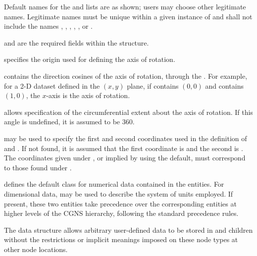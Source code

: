 \begin{notes}
\item Default names for the  and
       lists are as shown; users may choose
      other legitimate names.
      Legitimate names must be unique within a given instance
      of  and shall not include the names
      , ,
      , ,
      , or .
\item {} and 
      are the required fields within the  structure.
\end{notes}

 specifies the origin used for
defining the axis of rotation.

 contains the direction cosines of the
axis of rotation, through the .
For example, for a 2-D dataset defined in the $(x,y)$ plane,
if  contains $(0,0)$ and
 contains $(1,0)$, the $x$-axis is the
axis of rotation.

 allows specification of the circumferential
extent about the axis of rotation.
If this angle is undefined, it is assumed to be 360\degree.

 may be used to specify the first and second
coordinates used in the definition of 
and .
If not found, it is assumed that the first coordinate is
 and the second is .
The coordinates given under , or implied by
using the default, must correspond to those found under
.

 defines the default class for numerical data contained
in the  entities.
For dimensional data,  may be used to describe
the system of units employed.
If present, these two entities take precedence over the corresponding
entities at higher levels of the CGNS hierarchy, following the standard
precedence rules.

The  data structure allows arbitrary
user-defined data to be stored in  and
 children without the restrictions or implicit
meanings imposed on these node types at other node locations.

